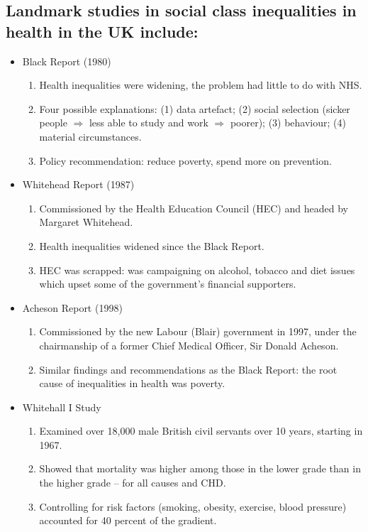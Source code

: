 \subsection{Landmark studies in social class inequalities in health in the UK include:}
\begin{itemize}
        \item Black Report (1980)
        \begin{enumerate}
            \item Health inequalities were widening, the problem had little to do with NHS.
            \item Four possible explanations: (1) data artefact; (2) social selection (sicker people $\Rightarrow$ less able to study and work $\Rightarrow$ poorer); (3) behaviour; (4) material circumstances.
            \item Policy recommendation: reduce poverty, spend more on prevention.
        \end{enumerate}
        
        \item Whitehead Report (1987)
        \begin{enumerate}
            \item Commissioned by the Health Education Council (HEC) and headed by
Margaret Whitehead.
            \item Health inequalities widened since the Black Report.
            \item HEC was scrapped: was campaigning on alcohol, tobacco and diet issues which upset some of the government’s financial supporters.
        \end{enumerate}
        
        \item Acheson Report (1998)
        \begin{enumerate}
            \item Commissioned by the new Labour (Blair) government in 1997, under the chairmanship of a former Chief Medical Officer, Sir Donald Acheson.
            \item Similar findings and recommendations as the Black Report: the root cause of inequalities in health was poverty.
        \end{enumerate}

        \item Whitehall I Study
        \begin{enumerate}
            \item Examined over 18,000 male British civil servants over 10 years, starting in 1967.
            \item Showed that mortality was higher among those in the lower grade than in the higher grade – for all causes and CHD.
            \item Controlling for risk factors (smoking, obesity, exercise, blood pressure) accounted for 40 percent of the gradient.
        \end{enumerate}


\end{itemize}
